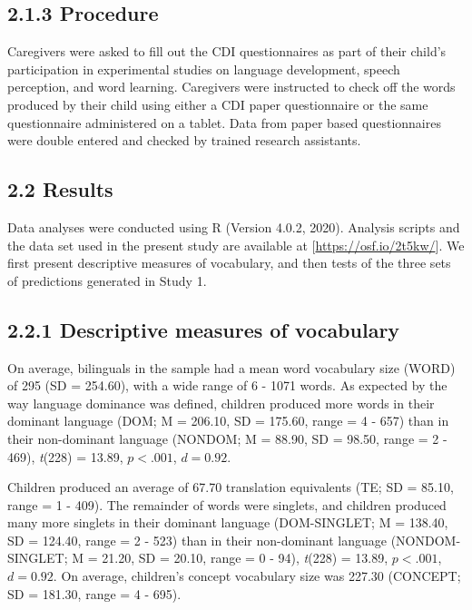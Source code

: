 \documentclass[
  english,
  ,man,floatsintext]{apa6}
\begin{document}
\hypertarget{procedure}{%
\subsection{2.1.3 Procedure}\label{procedure}}

Caregivers were asked to fill out the CDI questionnaires as part of their child's participation in experimental studies on language development, speech perception, and word learning. Caregivers were instructed to check off the words produced by their child using either a CDI paper questionnaire or the same questionnaire administered on a tablet. Data from paper based questionnaires were double entered and checked by trained research assistants.

\hypertarget{results}{%
\subsection{2.2 Results}\label{results}}

Data analyses were conducted using R (Version 4.0.2, 2020). Analysis scripts and the data set used in the present study are available at {[}\url{https://osf.io/2t5kw/}{]}. We first present descriptive measures of vocabulary, and then tests of the three sets of predictions generated in Study 1.

\hypertarget{descriptive-measures-of-vocabulary}{%
\subsection{2.2.1 Descriptive measures of vocabulary}\label{descriptive-measures-of-vocabulary}}

On average, bilinguals in the sample had a mean word vocabulary size (WORD) of 295 (SD = 254.60), with a wide range of 6 - 1071 words. As expected by the way language dominance was defined, children produced more words in their dominant language (DOM; M = 206.10, SD = 175.60, range = 4 - 657) than in their non-dominant language (NONDOM; M = 88.90, SD = 98.50, range = 2 - 469), \emph{t}(228) = 13.89, \(p < .001\), \(d = 0.92\).

Children produced an average of 67.70 translation equivalents (TE; SD = 85.10, range = 1 - 409). The remainder of words were singlets, and children produced many more singlets in their dominant language (DOM-SINGLET; M = 138.40, SD = 124.40, range = 2 - 523) than in their non-dominant language (NONDOM-SINGLET; M = 21.20, SD = 20.10, range = 0 - 94), \emph{t}(228) = 13.89, \(p < .001\), \(d = 0.92\). On average, children's concept vocabulary size was 227.30 (CONCEPT; SD = 181.30, range = 4 - 695).
\end{document}
